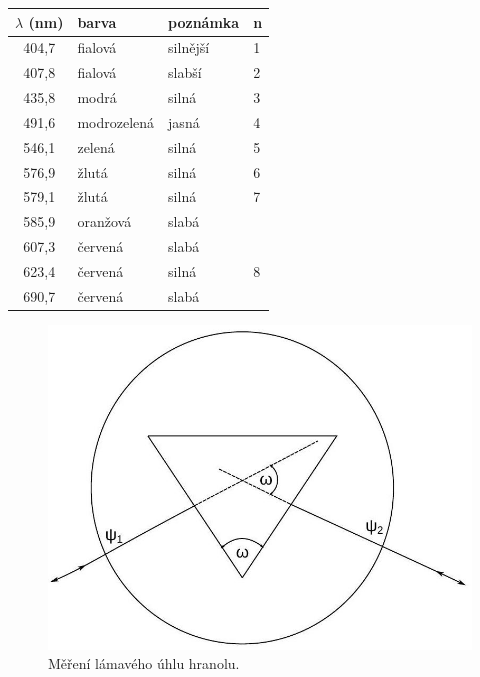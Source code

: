 \documentclass[czech,11pt,a4paper]{article}
\begin{document}
\begin{multicols}{2}
\begin{center}
	\begin{tabular}{|c|l|l|l|}
		\hline
		$\lambda$ (nm) & barva & poznámka & n\\
		\hline
		404,7 & fialová & silnější & 1 \\
		407,8 & fialová & slabší & 2 \\
		435,8 & modrá & silná & 3 \\
		491,6 & modrozelená & jasná & 4 \\
		546,1 & zelená & silná & 5 \\
		576,9 & žlutá & silná & 6 \\
		579,1 & žlutá & silná & 7 \\
		585,9 & oranžová & slabá &  \\
		607,3 & červená & slabá &  \\
		623,4 & červená & silná & 8 \\
		690,7 & červená & slabá &  \\
		\hline
	\end{tabular}
\end{center}


\begin{figure}[H]
		\includegraphics[max width=0.95\linewidth, center]{2024_12_03_db7ee7d12aab7219c185g-5}
		\caption{Měření lámavého úhlu hranolu.}
\end{figure}



\end{multicols}
\end{document}
